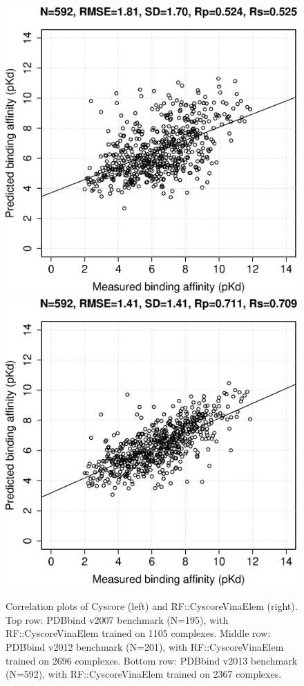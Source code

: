 \documentclass[journal=jacsat,manuscript=article]{achemso}
\begin{document}
\begin{figure}[ht!]
\endminipage
\\
\includegraphics[width=\linewidth]{../rfcyscore/x4/mlr/trn-247-tst-592-yp.eps}
\endminipage
{}
\includegraphics[width=\linewidth]{../rfcyscore/x46/rf/trn-2367-tst-592-yp.eps}
\endminipage
\caption{Correlation plots of Cyscore (left) and RF::CyscoreVinaElem (right). Top row: PDBbind v2007 benchmark (N=195), with RF::CyscoreVinaElem trained on 1105 complexes. Middle row: PDBbind v2012 benchmark (N=201), with RF::CyscoreVinaElem trained on 2696 complexes. Bottom row: PDBbind v2013 benchmark (N=592), with RF::CyscoreVinaElem trained on 2367 complexes.}
\label{fig:cor}
\end{figure}
\end{document}
